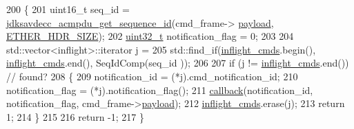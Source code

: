 \begin{DoxyCode}
200 \{
201     uint16\_t seq\_id = \hyperlink{group__acmpdu_gaf20d00ac6431b19d3f1213b4b6bf6fd5}{jdksavdecc\_acmpdu\_get\_sequence\_id}(cmd\_frame->
      \hyperlink{structjdksavdecc__frame_a220ad076814a31ae0163e722e523de46}{payload}, \hyperlink{namespaceavdecc__lib_a6c827b1a0d973e18119c5e3da518e65ca9512ad9b34302ba7048d88197e0a2dc0}{ETHER\_HDR\_SIZE});
202     \hyperlink{parse_8c_a6eb1e68cc391dd753bc8ce896dbb8315}{uint32\_t} notification\_flag = 0;
203 
204     std::vector<inflight>::iterator j =
205         std::find\_if(\hyperlink{classavdecc__lib_1_1acmp__controller__state__machine_a0475b054c1890c88809394d9cef2a4c0}{inflight\_cmds}.begin(), \hyperlink{classavdecc__lib_1_1acmp__controller__state__machine_a0475b054c1890c88809394d9cef2a4c0}{inflight\_cmds}.end(), SeqIdComp(seq\_id
      ));
206 
207     \textcolor{keywordflow}{if} (j != \hyperlink{classavdecc__lib_1_1acmp__controller__state__machine_a0475b054c1890c88809394d9cef2a4c0}{inflight\_cmds}.end()) \textcolor{comment}{// found?}
208     \{
209         notification\_id = (*j).cmd\_notification\_id;
210         notification\_flag = (*j).notification\_flag();
211         \hyperlink{classavdecc__lib_1_1acmp__controller__state__machine_a5803ae7099ff1a9c0721244e3d9b77b4}{callback}(notification\_id, notification\_flag, cmd\_frame->\hyperlink{structjdksavdecc__frame_a220ad076814a31ae0163e722e523de46}{payload});
212         \hyperlink{classavdecc__lib_1_1acmp__controller__state__machine_a0475b054c1890c88809394d9cef2a4c0}{inflight\_cmds}.erase(j);
213         \textcolor{keywordflow}{return} 1;
214     \}
215 
216     \textcolor{keywordflow}{return} -1;
217 \}
\end{DoxyCode}



